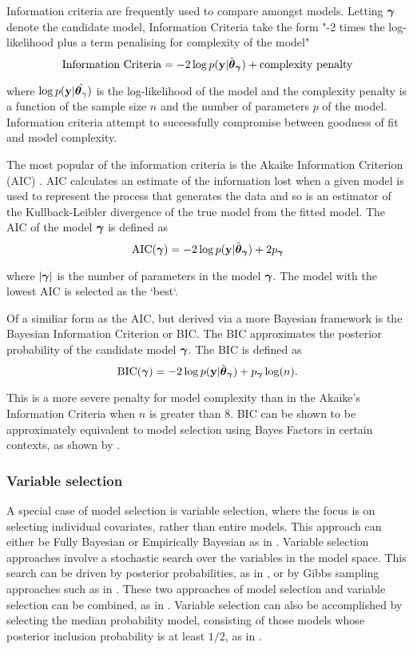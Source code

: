 
Information criteria are frequently used to compare amongst models. Letting ${\boldsymbol \gamma}$ denote the candidate model,
Information Criteria take the form "-2 times the log-likelihood plus a term penalising for complexity of
the model"
\[
	\text{Information Criteria} = -2 \log p({\bf y} | \hat{{\boldsymbol \theta}}_{\boldsymbol \gamma}) + \text{complexity penalty}
\]

\noindent where $\log p({\bf y} | \hat{{\boldsymbol \theta}_\gamma})$ is the log-likelihood of the model and the complexity
penalty is a function of the sample size $n$ and the number of parameters $p$ of the model. Information
criteria attempt to successfully compromise between goodness of fit and model complexity.

The most popular of the information criteria is the Akaike Information Criterion (AIC) \citep{Akaike1974}. AIC
calculates an estimate of the information lost when a given model is used to represent the process that
generates the data and so is an estimator of the Kullback-Leibler divergence of the true model from the fitted
model. The AIC of the model ${\boldsymbol \gamma}$ is defined as
\[
	\text{AIC}({\boldsymbol \gamma}) = -2 \log p({\bf y} | \hat{{\boldsymbol \theta}}_{\boldsymbol \gamma}) + 2 p_{\boldsymbol \gamma}
\]

\noindent where $|{\boldsymbol \gamma}|$ is the number of parameters in the model ${\boldsymbol \gamma}$. The model with the lowest AIC
is selected as the `best`.

Of a similiar form as the AIC, but derived via a more Bayesian framework is the Bayesian Information Criterion
or BIC. The BIC approximates the posterior probability of the candidate model ${\boldsymbol \gamma}$. The BIC is defined as
\[
	\text{BIC}({\boldsymbol \gamma}) = -2 \log p({\bf y} | \hat{{\boldsymbol \theta}}_{\boldsymbol \gamma}) + p_{\boldsymbol \gamma} \log(n).
\]

\noindent This is a more severe penalty for model complexity than in the Akaike's Information Criteria when
$n$ is greater than $8$. BIC can be shown to be approximately equivalent to model selection using Bayes
Factors in certain contexts, as shown by \cite{Kass1993}.

\subsubsection{Variable selection}
A special case of model selection is variable selection, where the focus is on selecting individual
covariates, rather than entire models. This approach can either be Fully Bayesian or Empirically Bayesian as
in \citep{Cui2008}. Variable selection approaches involve a stochastic search over the variables in the model
space. This search can be driven by posterior probabilities, as in \citep{Casella2006}, or by Gibbs sampling
approaches such as in \citep{George1993}. These two approaches of model selection and variable selection can
be combined, as in \citep{Geweke1996}. Variable selection can also be accomplished by selecting the median
probability model, consisting of those models whose posterior inclusion probability is at least $1/2$, as in
\citep{Barbieri2004}.

